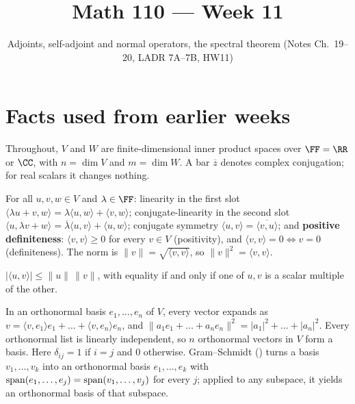 \documentclass[10pt]{scrartcl}
\title{Math 110 --- Week 11}
\subtitle{Adjoints, self-adjoint and normal operators, the spectral theorem (Notes Ch.~19--20, LADR 7A--7B, HW11)}
\author{}\date{}\ihead{}
\begin{document}
\maketitle

\section{Facts used from earlier weeks}

Throughout, $V$ and $W$ are finite-dimensional inner product spaces over $\FF=\RR$ or $\CC$, with $n=\dim V$ and $m=\dim W$. A bar $\overline{z}$ denotes complex conjugation; for real scalars it changes nothing.

\begin{enumerate}[label=(T\arabic*),leftmargin=2.6em,itemsep=8pt]
  \ii {} For all $u,v,w\in V$ and $\lambda\in\FF$: linearity in the first slot $\langle \lambda u+v,w\rangle = \lambda\langle u,w\rangle + \langle v,w\rangle$; conjugate-linearity in the second slot $\langle u,\lambda v+w\rangle = \overline{\lambda}\langle u,v\rangle + \langle u,w\rangle$; conjugate symmetry $\langle u,v\rangle = \overline{\langle v,u\rangle}$; and \textbf{positive definiteness}: $\langle v,v\rangle \ge 0$ for every $v\in V$ (positivity), and $\langle v,v\rangle = 0 \iff v=0$ (definiteness). The norm is $\|v\|=\sqrt{\langle v,v\rangle}$, so $\|v\|^2=\langle v,v\rangle$.

  \ii {} $|\langle u,v\rangle| \le \|u\|\,\|v\|$, with equality if and only if one of $u,v$ is a scalar multiple of the other.

  \ii {} In an orthonormal basis $e_1,\dots,e_n$ of $V$, every vector expands as $v = \langle v,e_1\rangle e_1 + \dots + \langle v,e_n\rangle e_n$, and $\|a_1e_1+\dots+a_ne_n\|^2 = |a_1|^2+\dots+|a_n|^2$. Every orthonormal list is linearly independent, so $n$ orthonormal vectors in $V$ form a basis. Here $\delta_{ij}=1$ if $i=j$ and $0$ otherwise. Gram--Schmidt () turns a basis $v_1,\dots,v_k$ into an orthonormal basis $e_1,\dots,e_k$ with $\operatorname{span}(e_1,\dots,e_j)=\operatorname{span}(v_1,\dots,v_j)$ for every $j$; applied to any subspace, it yields an orthonormal basis of that subspace.


\end{enumerate}
\end{document}
